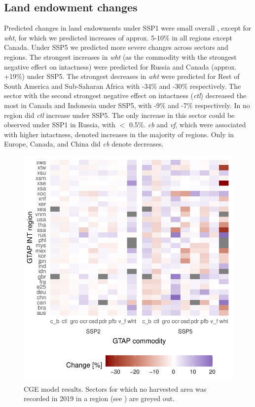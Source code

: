 \documentclass[titlesmallcaps,copyrightpage]{uomthesis}\usepackage[]{graphicx}\usepackage[]{color}
\begin{document}
\subsection{Land endowment changes}
Predicted changes in land endowments under SSP1 were small overall , except for \textit{wht}, for which we predicted increases of approx. 5-10\% in all regions except Canada.
Under SSP5 we predicted more severe changes across sectors and regions. The strongest increases in \textit{wht} (as the commodity with the strongest negative effect on intactness) were predicted for Russia and Canada (approx. +19\%) under SSP5. The strongest decreases in \textit{wht} were predicted for Rest of South America and Sub-Saharan Africa with -34\% and -30\% respectively. The sector with the second strongest negative effect on intactness (\textit{ctl}) decreased the most in Canada and Indonesia under SSP5, with -9\% and -7\% respectively. In no region did \textit{ctl} increase under SSP5. The only increase in this sector could be observed under SSP1 in Russia, with \(<\) 0.5\%. \textit{c\textunderscore b} and \textit{v\textunderscore f}, which were associated with higher intactness, denoted increases in the majority of regions. Only in Europe, Canada, and China did \textit{c\textunderscore b} denote decreases.

\begin{figure}[htb]
  \centering
    \includegraphics{chapters/figures/chapter4/fig_gtap.pdf}
    \caption{CGE model results. Sectors for which no harvested area was recorded in 2019 in a region (see ) are greyed out.}
    \label{ch4:fig_gtap}
\end{figure}
\end{document}

